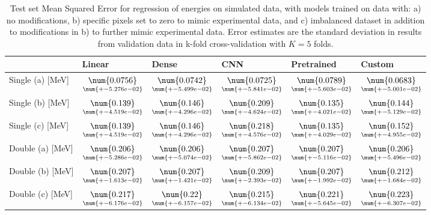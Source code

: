 \begin{table}
\centering
\caption{
Test set Mean Squared Error for regression of energies on simulated data, with models trained on data with: 
a) no modifications, b) specific pixels set to zero to mimic experimental data, and c) imbalanced dataset
in addition to modifications in b) to further mimic experimental data. Error estimates are the standard deviation 
in results from validation data in k-fold cross-validation with $K=5$ folds.
}
\label{tab:regression-simulated-all-energies-r2}
\begin{tabular}{llllll}
\toprule
{} &                                               Linear &                                                Dense &                                                  CNN &                                           Pretrained &                                               Custom \\
\midrule
Single (a) [MeV] &  $\underset{\num{+- 5.276e-02 }  }{\num{ 0.0756 } }$ &  $\underset{\num{+- 5.499e-02 }  }{\num{ 0.0742 } }$ &  $\underset{\num{+- 5.841e-02 }  }{\num{ 0.0725 } }$ &  $\underset{\num{+- 5.603e-02 }  }{\num{ 0.0789 } }$ &  $\underset{\num{+- 5.001e-02 }  }{\num{ 0.0683 } }$ \\
Single (b) [MeV] &  $\underset{\num{+- 4.519e-02 }  }{\num{ 0.139 } }$ &  $\underset{\num{+- 4.296e-02 }  }{\num{ 0.146 } }$ &  $\underset{\num{+- 4.624e-02 }  }{\num{ 0.209 } }$ &  $\underset{\num{+- 4.021e-02 }  }{\num{ 0.135 } }$ &  $\underset{\num{+- 5.129e-02 }  }{\num{ 0.144 } }$ \\
Single (c) [MeV] &  $\underset{\num{+- 4.519e-02 }  }{\num{ 0.139 } }$ &  $\underset{\num{+- 4.296e-02 }  }{\num{ 0.146 } }$ &  $\underset{\num{+- 4.576e-02 }  }{\num{ 0.218 } }$ &  $\underset{\num{+- 4.029e-02 }  }{\num{ 0.135 } }$ &  $\underset{\num{+- 4.955e-02 }  }{\num{ 0.152 } }$ \\
Double (a) [MeV] &  $\underset{\num{+- 5.286e-02 }  }{\num{ 0.206 } }$ &  $\underset{\num{+- 5.074e-02 }  }{\num{ 0.206 } }$ &  $\underset{\num{+- 5.862e-02 }  }{\num{ 0.207 } }$ &  $\underset{\num{+- 5.116e-02 }  }{\num{ 0.207 } }$ &  $\underset{\num{+- 5.496e-02 }  }{\num{ 0.206 } }$ \\
Double (b) [MeV] &  $\underset{\num{+- 1.613e-02 }  }{\num{ 0.207 } }$ &  $\underset{\num{+- 1.421e-02 }  }{\num{ 0.207 } }$ &  $\underset{\num{+- 2.393e-02 }  }{\num{ 0.209 } }$ &  $\underset{\num{+- 1.992e-02 }  }{\num{ 0.207 } }$ &  $\underset{\num{+- 1.684e-02 }  }{\num{ 0.212 } }$ \\
Double (c) [MeV] &  $\underset{\num{+- 6.176e-02 }  }{\num{ 0.217 } }$ &  $\underset{\num{+- 6.157e-02 }  }{\num{ 0.22 } }$ &  $\underset{\num{+- 6.134e-02 }  }{\num{ 0.215 } }$ &  $\underset{\num{+- 5.645e-02 }  }{\num{ 0.221 } }$ &  $\underset{\num{+- 6.307e-02 }  }{\num{ 0.223 } }$ \\
\bottomrule
\end{tabular}
\end{table}
